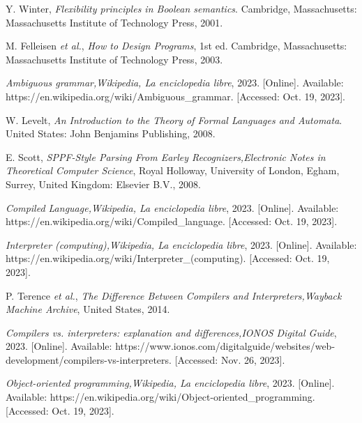 \begin{thebibliography}{11}
    \label{sec:38}
    \hypertarget{38}{}
    Y. Winter, \textit{Flexibility principles in Boolean semantics}. Cambridge, Massachusetts: Massachusetts Institute of Technology Press, 2001.

    \label{sec:39}
    \hypertarget{39}{}
    M. Felleisen \textit{et al.}, \textit{How to Design Programs}, 1st ed. Cambridge, Massachusetts: Massachusetts Institute of Technology Press, 2003.

    \label{sec:40}
    \hypertarget{40}{}
    \textit{Ambiguous grammar,}\textit{Wikipedia, La enciclopedia libre}, 2023. [Online]. Available: https://en.wikipedia.org/wiki/Ambiguous\_grammar. [Accessed: Oct. 19, 2023].

    \label{sec:41}
    \hypertarget{41}{}
    W. Levelt, \textit{An Introduction to the Theory of Formal Languages and Automata}. United States: John Benjamins Publishing, 2008.

    \label{sec:42}
    \hypertarget{42}{}
    E. Scott, \textit{SPPF-Style Parsing From Earley Recognizers,}\textit{Electronic Notes in Theoretical Computer Science}, Royal Holloway, University of London, Egham, Surrey, United Kingdom: Elsevier B.V., 2008.

    \label{sec:43}
    \hypertarget{43}{}
    \textit{Compiled Language,}\textit{Wikipedia, La enciclopedia libre}, 2023. [Online]. Available: https://en.wikipedia.org/wiki/Compiled\_language. [Accessed: Oct. 19, 2023].

    \label{sec:44}
    \hypertarget{44}{}
    \textit{Interpreter (computing),}\textit{Wikipedia, La enciclopedia libre}, 2023. [Online]. Available: https://en.wikipedia.org/wiki/Interpreter\_(computing). [Accessed: Oct. 19, 2023].

    \label{sec:45}
    \hypertarget{45}{}
    P. Terence \textit{et al.}, \textit{The Difference Between Compilers and Interpreters,}\textit{Wayback Machine Archive}, United States, 2014.

    \label{sec:46}
    \hypertarget{46}{}
    \textit{Compilers vs. interpreters: explanation and differences,}\textit{IONOS Digital Guide}, 2023. [Online]. Available: https://www.ionos.com/digitalguide/websites/web-development/compilers-vs-interpreters. [Accessed: Nov. 26, 2023].

    \label{sec:47}
    \hypertarget{47}{}
    \textit{Object-oriented programming,}\textit{Wikipedia, La enciclopedia libre}, 2023. [Online]. Available: https://en.wikipedia.org/wiki/Object-oriented\_programming. [Accessed: Oct. 19, 2023].


\end{thebibliography}

